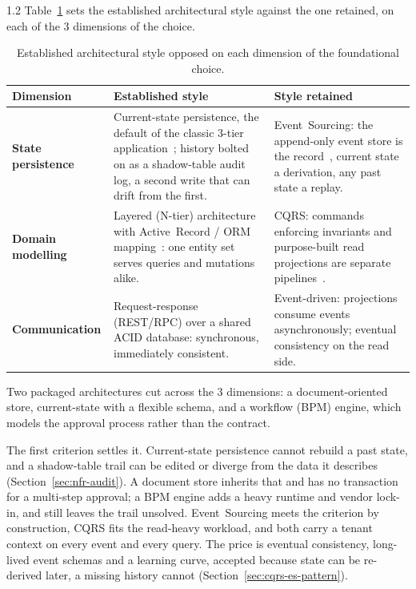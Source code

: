 \begin{spacing}{1.2}
Table~\ref{tab:arch-dimensions} sets the established architectural style
against the one retained, on each of the 3 dimensions of the choice.

\begin{table}[H]
  \centering
  \caption{Established architectural style opposed on each dimension of the
           foundational choice.}
  \label{tab:arch-dimensions}
  \footnotesize
  \begin{tabularx}{\linewidth}{|>{\bfseries}l|X|X|}
    \hline
    Dimension & Established style & Style retained \\
    \hline\hline
    State persistence & Current-state persistence, the default of the classic
      3-tier application~\cite{Fowler2003}; history bolted on as a
      shadow-table audit log, a second write that can drift from the first. &
      Event~Sourcing: the append-only event store is the
      record~\cite{FowlerEventSourcing,Young2010}, current state a derivation,
      any past state a replay. \\
    \hline
    Domain modelling & Layered (N-tier) architecture with Active~Record / ORM
      mapping~\cite{Fowler2003}: one entity set serves queries and mutations
      alike. & CQRS: commands enforcing invariants and purpose-built read
      projections are separate pipelines~\cite{FowlerCQRS,Young2010}. \\
    \hline
    Communication & Request-response (REST/RPC) over a shared ACID database:
      synchronous, immediately consistent. & Event-driven: projections consume
      events asynchronously; eventual consistency on the read side. \\
    \hline
  \end{tabularx}
\end{table}

Two packaged architectures cut across the 3 dimensions: a
document-oriented store, current-state with a flexible schema, and a
workflow (BPM) engine, which models the approval process rather than the
contract.

The first criterion settles it. Current-state persistence cannot rebuild a
past state, and a shadow-table trail can be edited or diverge from the data
it describes (Section~\ref{sec:nfr-audit}). A document store inherits that
and has no transaction for a multi-step approval; a BPM engine adds a heavy
runtime and vendor lock-in, and still leaves the trail unsolved.
Event~Sourcing meets the criterion by construction, CQRS fits the read-heavy
workload, and both carry a tenant context on every event and every query.
The price is eventual consistency, long-lived event schemas and a learning
curve, accepted because state can be re-derived later, a missing history
cannot (Section~\ref{sec:cqrs-es-pattern}).
\vspace{1cm}


\end{spacing}
